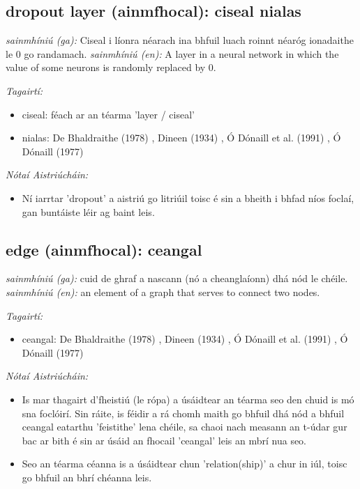 \documentclass{article}
\begin{document}
\subsection*{dropout layer (ainmfhocal): ciseal nialas} 
 \noindent \textit{sainmhíniú (ga):} Ciseal i líonra néarach ina bhfuil luach roinnt néaróg ionadaithe le 0 go randamach.
\newline\newline
 \noindent \textit{sainmhíniú (en):} A layer in a neural network in which the value of some neurons is randomly replaced by 0.
\newline

 \noindent \textit{Tagairtí:}
\begin{itemize}
	\item ciseal: féach ar an téarma 'layer / ciseal'
	\item nialas: De Bhaldraithe (1978) \cite{de-bhaldraithe}, Dineen (1934) \cite{dineen}, Ó Dónaill et al. (1991) \cite{focloir-beag}, Ó Dónaill (1977) \cite{odonaill}
\end{itemize}

 \noindent \textit{Nótaí Aistriúcháin:}
\begin{itemize}
	\item Ní iarrtar 'dropout' a aistriú go litriúil toisc é sin a bheith i bhfad níos foclaí, gan buntáiste léir ag baint leis.
\end{itemize}


\subsection*{edge (ainmfhocal): ceangal} 
 \noindent \textit{sainmhíniú (ga):} cuid de ghraf a nascann (nó a cheanglaíonn) dhá nód le chéile.
\newline\newline
 \noindent \textit{sainmhíniú (en):} an element of a graph that serves to connect two nodes.
\newline

 \noindent \textit{Tagairtí:}
\begin{itemize}
	\item ceangal: De Bhaldraithe (1978) \cite{de-bhaldraithe}, Dineen (1934) \cite{dineen}, Ó Dónaill et al. (1991) \cite{focloir-beag}, Ó Dónaill (1977) \cite{odonaill}
\end{itemize}

 \noindent \textit{Nótaí Aistriúcháin:}
\begin{itemize}
	\item Is mar thagairt d'fheistiú (le rópa) a úsáidtear an téarma seo den chuid is mó sna foclóirí. Sin ráite, is féidir a rá chomh maith go bhfuil dhá nód a bhfuil ceangal eatarthu 'feistithe' lena chéile, sa chaoi nach measann an t-údar gur bac ar bith é sin ar úsáid an fhocail 'ceangal' leis an mbrí nua seo.
	\item Seo an téarma céanna is a úsáidtear chun 'relation(ship)' a chur in iúl, toisc go bhfuil an bhrí chéanna leis.
\end{itemize}
\end{document}
